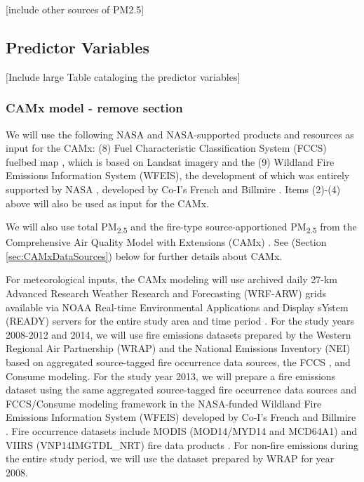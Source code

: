 \documentclass[authoryear]{elsarticle}
\begin{document}
[include other sources of PM2.5]

\subsection{Predictor Variables} %

[Include large Table cataloging the predictor variables]

\subsubsection{CAMx model - remove section} %

We will use the following NASA and NASA-supported products and resources as input for the CAMx: 
(8) Fuel Characteristic Classification System (FCCS) fuelbed map \citep{McKenzie2012}, which is based on Landsat imagery and the 
(9) Wildland Fire Emissions Information System (WFEIS), the development of which was entirely supported by NASA  \citep{WFEIS2017}, developed by Co-I's French and Billmire \citep{French2014}. Items (2)-(4) above will also be used as input for the CAMx.

We will also use total PM\textsubscript{2.5} and the fire-type source-apportioned PM\textsubscript{2.5} from the Comprehensive Air Quality Model with Extensions (CAMx) \citep{CAMx2017}. See  (Section \ref{sec:CAMxDataSources}) below for further details about CAMx. 

For meteorological inputs, the CAMx modeling will use archived daily 27-km Advanced Research Weather Research and Forecasting (WRF-ARW) grids available via NOAA Real-time Environmental Applications and Display sYstem (READY) servers for the entire study area and time period \citep{Wang2007,Rolph2017}. For the study years 2008-2012 and 2014, we will use fire emissions datasets prepared by the Western Regional Air Partnership (WRAP) and the National Emissions Inventory (NEI) \citep{EPANEI2017} based on aggregated source-tagged fire occurrence 
data sources, the FCCS \citep{Ottmar2007}, and Consume \citep{Prichard2009}
modeling. For the study year 2013, we will prepare a fire emissions dataset using the same aggregated source-tagged fire occurrence data sources and FCCS/Consume modeling framework in the NASA-funded  Wildland Fire Emissions Information System (WFEIS) \citep{WFEIS2017} developed by Co-I's French and Billmire \citep{French2014}. Fire occurrence datasets include MODIS  (MOD14/MYD14 and MCD64A1) and  VIIRS (VNP14IMGTDL\_NRT) fire data products \citep{Giglio2006,MODISBurnArea,Schroeder2014}. 
For non-fire emissions during the entire study period, we will use the dataset prepared by WRAP for year 2008.
\end{document}
